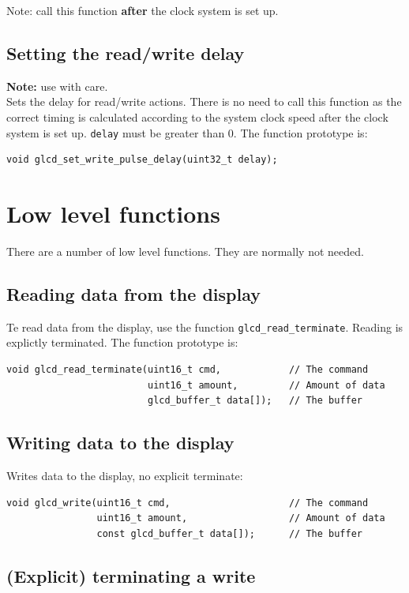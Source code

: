 \documentclass[12pt]{article}
\begin{document}
Note: call this function \textbf{after} the clock system is set up.

\subsection{Setting the read/write delay}
\textbf{Note:} use with care.\\
Sets the delay for read/write actions. There is no need to call this function as the correct timing is calculated according to the system clock speed after the clock system is set up. \lstinline|delay| must be greater than 0. The function prototype is:
\begin{lstlisting}
void glcd_set_write_pulse_delay(uint32_t delay);
\end{lstlisting}


\section{Low level functions}
There are a number of low level functions. They are normally not needed.

\subsection{Reading data from the display}
Te read data from the display, use the function \lstinline|glcd_read_terminate|. Reading is explictly terminated. The function prototype is:

\begin{lstlisting}
void glcd_read_terminate(uint16_t cmd,            // The command
                         uint16_t amount,         // Amount of data
                         glcd_buffer_t data[]);   // The buffer
\end{lstlisting}

\subsection{Writing data to the display}
Writes data to the display, no explicit terminate:
\begin{lstlisting}
void glcd_write(uint16_t cmd,                     // The command
                uint16_t amount,                  // Amount of data
                const glcd_buffer_t data[]);      // The buffer
\end{lstlisting}

\subsection{(Explicit) terminating a write}
\end{document}
